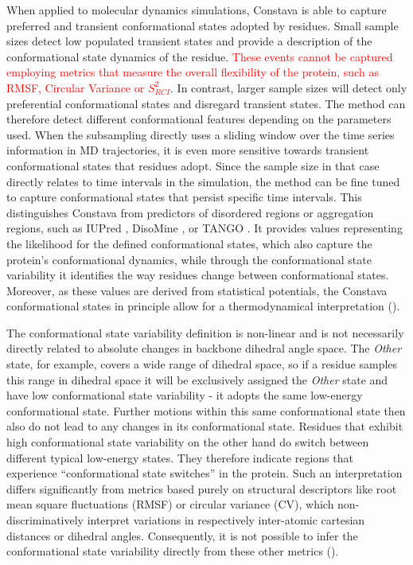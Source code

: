 When applied to molecular dynamics simulations, Constava is able to capture preferred and transient conformational states adopted by residues. Small sample sizes detect low populated transient states and provide a description of the conformational state dynamics of the residue. \textcolor{red}{These events cannot be captured employing metrics that measure the overall flexibility of the protein, such as RMSF, Circular Variance or $S^{2}_{RCI}$}. In contrast, larger sample sizes will detect only preferential conformational states and disregard transient states. The method can therefore detect different conformational features depending on the parameters used. When the subsampling directly uses a sliding window over the time series information in MD trajectories, it is even more sensitive towards transient conformational states that residues adopt. Since the sample size in that case directly relates to time intervals in the simulation, the method can be fine tuned to capture conformational states that persist specific time intervals. This distinguishes Constava from predictors of disordered regions or aggregation regions, such as IUPred \cite{erdos_iupred3_2021}, DisoMine \cite{orlando_prediction_2022}, or TANGO \cite{fernandez-escamilla_prediction_2004}. It provides values representing the likelihood for the defined conformational states, which also capture the protein's conformational dynamics, while through the conformational state variability it identifies the way residues change between conformational states. Moreover, as these values are derived from statistical potentials, the Constava conformational states in principle allow for a thermodynamical interpretation ().

The conformational state variability definition is non-linear and is not necessarily directly related to absolute changes in backbone dihedral angle space. The \textit{Other} state, for example, covers a wide range of dihedral space, so if a residue samples this range in dihedral space it will be exclusively assigned the \textit{Other} state and have low conformational state variability - it adopts the same low-energy conformational state. Further motions within this same conformational state then also do not lead to any changes in its conformational state. Residues that exhibit high conformational state variability on the other hand do switch between different typical low-energy states. They therefore indicate regions that experience ``conformational state switches'' in the protein. Such an interpretation differs significantly from metrics based purely on structural descriptors like root mean square fluctuations (RMSF) or circular variance (CV), which non-discriminatively interpret variations in respectively inter-atomic cartesian distances or dihedral angles. Consequently, it is not possible to infer the conformational state variability directly from these other metrics ().

